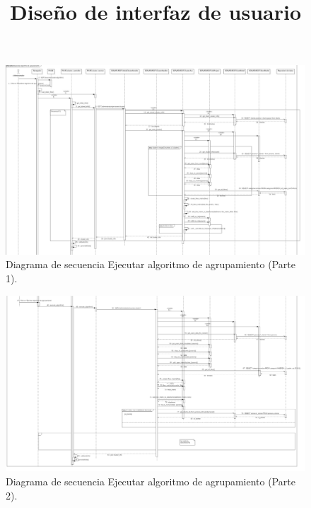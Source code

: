 \FloatBarrier
\begin{figure}[htbp!]
		\centering
			\includegraphics[width=1.1 \textwidth]{imagenes/DSRuben/CLUSTER1}
		\caption{Diagrama de secuencia Ejecutar algoritmo de agrupamiento (Parte 1). }
		\label{PADS:ejecutarcluster1}
\end{figure}
\FloatBarrier

\FloatBarrier
\begin{figure}[htbp!]
		\centering
			\includegraphics[width=1.1 \textwidth]{imagenes/DSRuben/CLUSTER2}
		\caption{Diagrama de secuencia Ejecutar algoritmo de agrupamiento (Parte 2). }
		\label{PADS:ejecutarcluster2}
\end{figure}
\FloatBarrier

\title{\textbf{Diseño de interfaz de usuario \\}}

